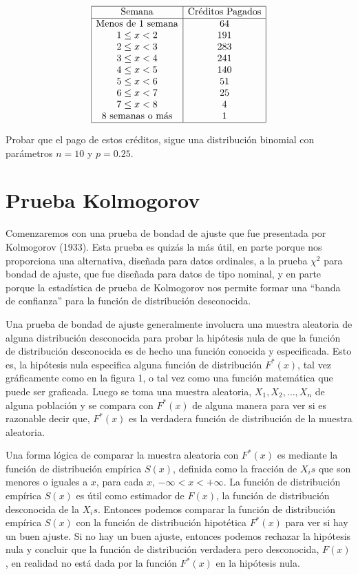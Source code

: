 \documentclass[
  a4paper,
  oneside,
  openany]{book}
\begin{document}
\[
\begin{array}{|c|c|  }
\hline
\mbox{Semana}& \mbox{Créditos Pagados}\\
\hline
\mbox{Menos de 1  semana} &64\\
1 \leq x < 2& 191\\
2 \leq  x < 3 &283\\
3 \leq  x < 4 &241\\
4 \leq  x < 5 &140\\
5 \leq  x < 6 &51\\
6 \leq  x < 7 &25\\
7 \leq  x < 8 &4\\
\mbox{8 semanas o más} & 1\\
\hline
\end{array}
\]

Probar que el pago de estos créditos, sigue una distribución binomial con parámetros \(n = 10\) y \(p = 0.25\).

\hypertarget{prueba-kolmogorov}{%
\chapter{Prueba Kolmogorov}\label{prueba-kolmogorov}}

Comenzaremos con una prueba de bondad de ajuste que fue presentada por Kolmogorov (1933). Esta prueba es quizás la más útil, en parte porque nos proporciona una alternativa, diseñada para datos ordinales, a la prueba \(\chi^2\) para bondad de ajuste, que fue diseñada para datos de tipo nominal, y en parte porque la estadística de prueba de Kolmogorov nos permite formar una ``banda de confianza'' para la función de distribución desconocida.

Una prueba de bondad de ajuste generalmente involucra una muestra aleatoria de alguna distribución desconocida para probar la hipótesis nula de que la función de distribución desconocida es de hecho una función conocida y especificada. Esto es, la hipótesis nula especifica alguna función de distribución \(F ^*(x)\), tal vez gráficamente como en la figura 1, o tal vez como una función matemática que puede ser graficada. Luego se toma una muestra aleatoria, \(X_{1},X_{2},\ldots, X_{n}\) de alguna población y se compara con \(F^*(x)\) de alguna manera para ver si es razonable decir que, \(F^*(x)\) es la verdadera función de distribución de la muestra aleatoria.

Una forma lógica de comparar la muestra aleatoria con \(F^*(x)\) es mediante la función de distribución empírica \(S(x)\), definida como la fracción de \(X_{i}s\) que son menores o iguales a \(x\), para cada \(x\), \(-\infty<x< + \infty\).
La función de distribución empírica \(S(x)\) es útil como estimador de \(F(x)\), la función de distribución desconocida de la \(X_{i}s\). Entonces podemos comparar la función de distribución empírica \(S(x)\) con la función de distribución hipotética \(F^*(x)\) para ver si hay un buen ajuste.
Si no hay un buen ajuste, entonces podemos rechazar la hipótesis nula y concluir que la función de distribución verdadera pero desconocida, \(F(x)\), en realidad no está dada por la función \(F^*(x)\) en la hipótesis nula.
\end{document}
